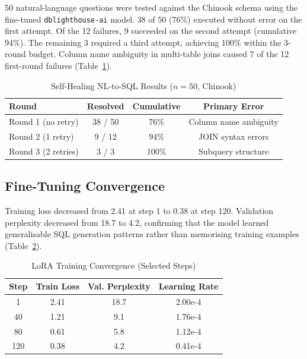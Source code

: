 \documentclass[conference]{IEEEtran}
\begin{document}
50 natural-language questions were tested against the Chinook schema using
the fine-tuned \texttt{dblighthouse-ai} model. 38 of 50 (76\%) executed
without error on the first attempt. Of the 12 failures, 9 succeeded on
the second attempt (cumulative 94\%). The remaining 3 required a third
attempt, achieving 100\% within the 3-round budget. Column name ambiguity
in multi-table joins caused 7 of the 12 first-round failures
(Table~\ref{tab:nlsql}).

\begin{table}[htbp]
\caption{Self-Healing NL-to-SQL Results ($n=50$, Chinook)}
\label{tab:nlsql}
\begin{tabular}{lccc}
\toprule
\textbf{Round} & \textbf{Resolved} & \textbf{Cumulative} & \textbf{Primary Error} \\
\midrule
Round 1 (no retry) & 38 / 50 & 76\% & Column name ambiguity \\
Round 2 (1 retry) & 9 / 12 & 94\% & JOIN syntax errors \\
Round 3 (2 retries) & 3 / 3 & 100\% & Subquery structure \\
\bottomrule
\end{tabular}
\end{table}

\subsection{Fine-Tuning Convergence}

Training loss decreased from 2.41 at step 1 to 0.38 at step 120.
Validation perplexity decreased from 18.7 to 4.2, confirming that the
model learned generalisable SQL generation patterns rather than memorising
training examples (Table~\ref{tab:finetune}).

\begin{table}[htbp]
\caption{LoRA Training Convergence (Selected Steps)}
\label{tab:finetune}
\begin{tabular}{cccc}
\toprule
\textbf{Step} & \textbf{Train Loss} & \textbf{Val. Perplexity} & \textbf{Learning Rate} \\
\midrule
1 & 2.41 & 18.7 & 2.00e-4 \\
40 & 1.21 & 9.1 & 1.76e-4 \\
80 & 0.61 & 5.8 & 1.12e-4 \\
120 & 0.38 & 4.2 & 0.41e-4 \\
\bottomrule
\end{tabular}
\end{table}
\end{document}
